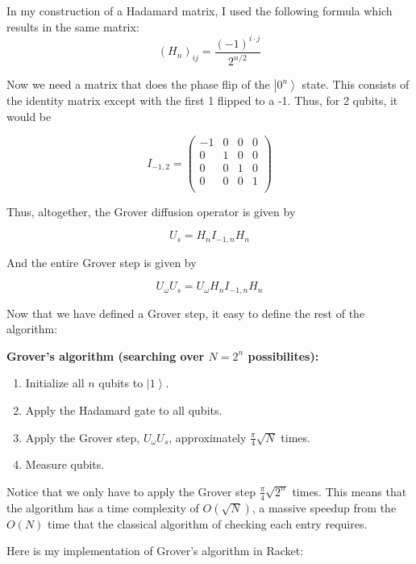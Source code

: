 \documentclass[11pt]{report}
\newcommand{\?}{\stackrel{?}{=}}
\begin{document}
In my construction of a Hadamard matrix, I used the following formula which results in the same matrix:
$$(H_{n})_{ij}= \frac{(-1)^{i\cdot j}}{2^{n/2}} $$

Now we need a matrix that does the phase flip of the $\left | 0^n \right \rangle$ state. This consists of the identity matrix except with the first 1 flipped to a -1. Thus, for 2 qubits, it would be

$$I_{-1,2}=\begin{pmatrix}
-1 & 0 & 0 & 0 \\
0 & 1 & 0 & 0 \\
0 & 0 & 1 & 0 \\
0 & 0 & 0 & 1 \\
\end{pmatrix}$$

Thus, altogether, the Grover diffusion operator is given by

$$U_{s}=H_{n} I_{-1,n} H_{n}$$

And the entire Grover step is given by

$$U_{\omega} U_{s} = U_{\omega} H_{n} I_{-1,n} H_{n}$$

Now that we have defined a Grover step, it easy to define the rest of the algorithm:

\begin{framed}
\textbf{Grover's algorithm (searching over $N=2^{n}$ possibilites):}
\begin{enumerate}
	\item Initialize all $n$ qubits to $\left | 1 \right \rangle$.
	\item Apply the Hadamard gate to all qubits.
	\item Apply the Grover step, $U_{\omega} U_{s}$, approximately $\frac{\pi}{4} \sqrt{N}$ times.
	\item Measure qubits.
\end{enumerate}
\end{framed}

Notice that we only have to apply the Grover step $\frac{\pi}{4} \sqrt{2^{n}}$ times. This means that the algorithm has a time complexity of $O(\sqrt{N})$, a massive speedup from the $O(N)$ time that the classical algorithm of checking each entry requires.

Here is my implementation of Grover's algorithm in Racket:
\end{document}
